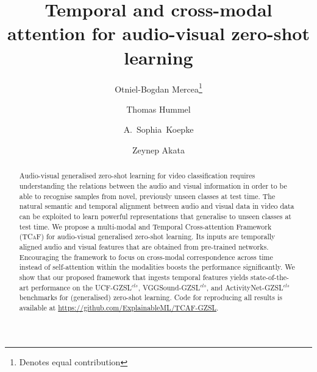 \documentclass[runningheads]{llncs}
\newcommand{\modelName}{\textsc{TCaF}\xspace}
\newcommand{\activity}{{ActivityNet-GZSL$^{cls}$}\xspace}
\newcommand{\ucf}{{UCF-GZSL$^{cls}$}\xspace}
\newcommand{\vgg}{{VGGSound-GZSL$^{cls}$}\xspace}
\begin{document}
\pagestyle{headings}
\mainmatter
\def\ECCVSubNumber{6942}  

\title{Temporal and cross-modal attention for audio-visual zero-shot learning} 

\begin{comment}
\titlerunning{ECCV-22 submission ID \ECCVSubNumber} 
\authorrunning{ECCV-22 submission ID \ECCVSubNumber} 
\author{Anonymous ECCV submission}
\institute{Paper ID \ECCVSubNumber}
\end{comment}


\newcommand*\samethanks[1][\value{footnote}]{\footnotemark[#1]}
\author{Otniel-Bogdan Mercea\thanks{Denotes equal contribution} \and
Thomas Hummel\samethanks{} \and
\mbox{A. Sophia Koepke} \and
Zeynep Akata}


\maketitle

\begin{abstract}
Audio-visual generalised zero-shot learning for video classification requires understanding the relations between
the audio and visual information in order to be able to recognise samples from novel, previously unseen classes at test time. 
The natural semantic and temporal alignment between audio and visual data in video data can be exploited to learn powerful representations that generalise to unseen classes at test time.
We propose a multi-modal and Temporal Cross-attention Framework (\modelName) for audio-visual generalised zero-shot learning. Its inputs are temporally aligned audio and visual features that are obtained from pre-trained networks. Encouraging the framework to focus on cross-modal correspondence across time instead of self-attention within the modalities boosts the performance significantly. We show that our proposed framework that ingests temporal features yields state-of-the-art performance on the \ucf, \vgg, and \activity benchmarks for (generalised) zero-shot learning. Code for reproducing all results is available at \url{https://github.com/ExplainableML/TCAF-GZSL}.
\end{abstract}
\end{document}

